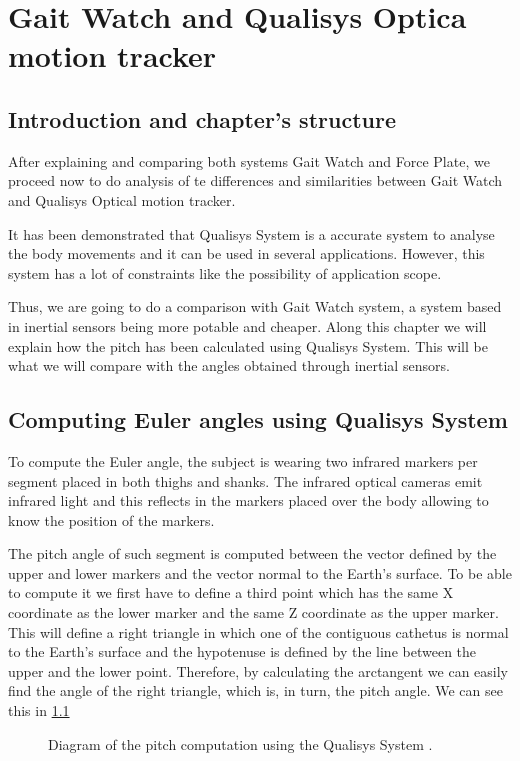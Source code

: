 \chapter{Gait Watch and Qualisys Optica motion tracker}
\label{ch:GWandQS}

\section{Introduction and chapter's structure}
After explaining and comparing both systems Gait Watch and Force Plate, we proceed now to do analysis of te differences and similarities between Gait Watch and Qualisys Optical motion tracker.

It has been demonstrated that Qualisys System is a accurate system to analyse the body movements and it can be used in several applications. However, this system has a lot of constraints like the possibility of application scope.

Thus, we are going to do a comparison with Gait Watch system, a system based in inertial sensors being more potable and cheaper.
Along this chapter we will explain how the pitch has been calculated using Qualisys System. This will be what we will compare with the angles obtained through inertial sensors.


\section{Computing Euler angles using Qualisys System}
To compute the Euler angle, the subject is wearing two infrared markers per segment placed in both thighs and shanks. The infrared optical cameras emit infrared light and this reflects in the markers placed over the body allowing to know the position of the markers.

The pitch angle of such segment is computed between the vector defined by the upper and lower markers and the vector normal to the Earth’s surface. To be able to compute it we first have to define a third point which has the same X coordinate as the lower marker and the same Z coordinate as the upper marker. This will define a right triangle in which one of the contiguous cathetus is normal to the Earth’s surface and the hypotenuse is defined by the line between the upper and the lower point. Therefore, by calculating the arctangent we can easily find the angle of the right triangle, which is, in turn, the pitch angle\cite{OlivaresBotzel2013}. We can see this in \ref{fig:pitchQS}

\begin{figure}[H]
	\centering
	\caption{Diagram of the pitch computation using the Qualisys System \cite{OlivaresBotzel2013}.}
	\label{fig:pitchQS}
\end{figure}

